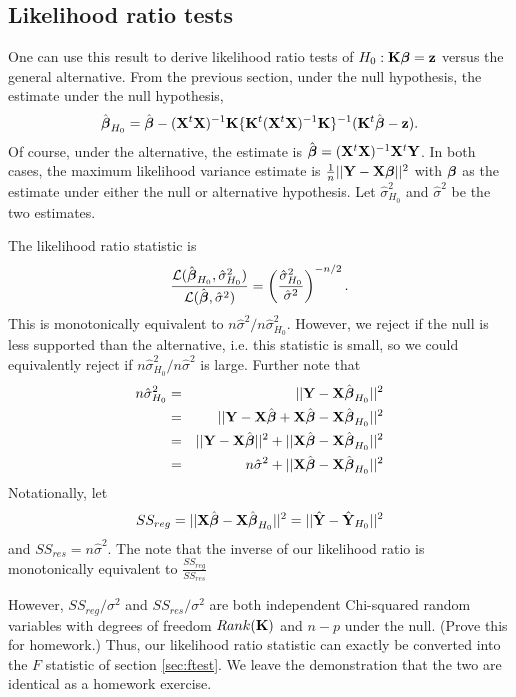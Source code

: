\subsection{Likelihood ratio tests}
One can use this result to derive likelihood ratio tests of $H_0: \mathbf{K} \boldsymbol{\beta} = \mathbf{z}$ versus
the general alternative. From the previous section, under the null hypothesis, the
estimate under the null hypothesis, 
$$\hat {\boldsymbol{\beta}}_{H_0} = \hat {\boldsymbol{\beta}} -  (\mathbf{X}^t \mathbf{X})^{-1} \mathbf{K} \{\mathbf{K}^t (\mathbf{X}^t \mathbf{X})^{-1} \mathbf{K}\}^{-1} (\mathbf{K}^t \hat {\boldsymbol{\beta}} - \mathbf{z}).$$
Of course, under the alternative, the estimate is $\hat {\boldsymbol{\beta}} = (\mathbf{X}^t \mathbf{X})^{-1} \mathbf{X}^t \mathbf{Y}$. In both
cases, the maximum likelihood variance estimate is $\frac{1}{n}||\mathbf{Y} - \mathbf{X} \boldsymbol{\beta}||^2$ with 
$\boldsymbol{\beta}$ as the estimate under either the null or alternative hypothesis. Let $\hat \sigma^2_{H_0}$
and $\hat \sigma^2$ be the two estimates.

The likelihood ratio statistic is
$$
\frac{{\cal L}(\hat {\boldsymbol{\beta}}_{H_0}, \hat \sigma^2_{H_0})}{{\cal L}(\hat {\boldsymbol{\beta}},\hat \sigma^2)}
= \left(\frac{\hat \sigma^2_{H_0}}{\hat \sigma^2} \right)^{-n/2}.
$$
This is monotonically equivalent to $n \hat \sigma^2 / n \hat \sigma^2_{H_0}$. However, we reject
if the null is less supported than the alternative, i.e. this statistic is small,
so we could equivalently reject if $n \hat \sigma^2_{H_0} / n \hat \sigma^2$ is large.
Further note
that 
\begin{eqnarray*}
n\hat \sigma^2_{H_0}
& = &||\mathbf{Y} - \mathbf{X} \hat {\boldsymbol{\beta}}_{H_0}||^2 \\
& = & ||\mathbf{Y} - \mathbf{X} \hat {\boldsymbol{\beta}} + \mathbf{X} \hat {\boldsymbol{\beta}} - \mathbf{X} \hat {\boldsymbol{\beta}}_{H_0}||^2 \\
& = & ||\mathbf{Y} - \mathbf{X} \hat{\boldsymbol{\beta}}||^2 + ||\mathbf{X} \hat {\boldsymbol{\beta}} - \mathbf{X} \hat {\boldsymbol{\beta}}_{H_0}||^2 \\
& = & n \hat \sigma^2 + ||\mathbf{X} \hat {\boldsymbol{\beta}} - \mathbf{X} \hat {\boldsymbol{\beta}}_{H_0}||^2
\end{eqnarray*}
Notationally, let $$SS_{reg} = ||\mathbf{X} \hat {\boldsymbol{\beta}} - \mathbf{X} \hat {\boldsymbol{\beta}}_{H_0}||^2
= ||\hat {\mathbf{Y}} - \hat {\mathbf{Y}}_{H_0}||^2$$ and
$SS_{res} = n \hat \sigma^2$. 
The note that the inverse of our likelihood ratio is monotonically equivalent to 
$\frac{SS_{reg}}{SS_{res}}$

However, $SS_{reg} / \sigma^2$ and $SS_{res} / \sigma^2$ are both independent 
Chi-squared random variables with degrees of freedom $Rank(\mathbf{K})$ and $n - p$
under the null. (Prove this for homework.) Thus, our likelihood ratio statistic can
exactly be converted into the $F$ statistic of section \ref{sec:ftest}. We leave
the demonstration that the two are identical as a homework exercise.

